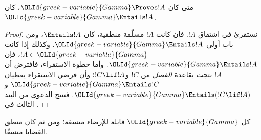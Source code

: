 \documentclass[../../../include/open-logic-section]{subfiles}
\begin{document}


\begin{thm}[السلامة] 
متى كان $\OLId{greek-variable}{Gamma}\Proves!A$، كان
$\OLId{greek-variable}{Gamma} \Entails !A$. 
\end{thm}

\begin{proof} 
نستقرئ في اشتقاق $!A$. فإن كانت $!A$ مسلّمة منطقية، كان $\Entails
!A$، ومن باب أولى $\OLId{greek-variable}{Gamma} \Entails!A$. وكذلك إذا كانت $!A \in \OLId{greek-variable}{Gamma}$،
فإن $\OLId{greek-variable}{Gamma} \Entails!A$. وأما خطوة الاستقراء، فافترض أن $!A$ نتجت بقاعدة
\emph{الفصل} من $!C$ و$!C\lif!A$؛ وأن فرضي الاستقراء يعطيان
$\OLId{greek-variable}{Gamma} \Entails !C$ و$\OLId{greek-variable}{Gamma} \Entails (!C\lif !A)$. فتنتج الدعوى من
البند الثالث في . 
\end{proof}

\begin{cor} 
كل $\OLId{greek-variable}{Gamma}$ قابلة للإرضاء متسقة؛ ومن ثم كان منطق القضايا متسقًا. 
\end{cor}
\end{document}
